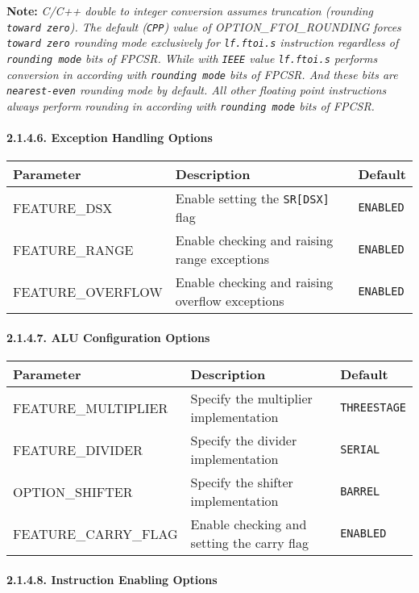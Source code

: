 \documentclass[]{article}
\let\oldparagraph\paragraph
\renewcommand{\paragraph}[1]{\oldparagraph{#1}\mbox{}}
\begin{document}
\textbf{Note:} \emph{C/C++ double to integer conversion assumes
truncation (rounding \texttt{toward\ zero}). The default (\texttt{CPP})
value of OPTION\_FTOI\_ROUNDING forces \texttt{toward\ zero} rounding
mode exclusively for \texttt{lf.ftoi.s} instruction regardless of
\texttt{rounding\ mode} bits of FPCSR. While with \texttt{IEEE} value
\texttt{lf.ftoi.s} performs conversion in according with
\texttt{rounding\ mode} bits of FPCSR. And these bits are
\texttt{nearest-even} rounding mode by default. All other floating point
instructions always perform rounding in according with
\texttt{rounding\ mode} bits of FPCSR.}

\paragraph{2.1.4.6. Exception Handling
Options}\label{exception-handling-options}

\begin{longtable}[]{@{}lll@{}}
\toprule
Parameter & Description & Default\tabularnewline
\midrule
\endhead
FEATURE\_DSX & Enable setting the \texttt{SR{[}DSX{]}} flag &
\texttt{ENABLED}\tabularnewline
FEATURE\_RANGE & Enable checking and raising range exceptions &
\texttt{ENABLED}\tabularnewline
FEATURE\_OVERFLOW & Enable checking and raising overflow exceptions &
\texttt{ENABLED}\tabularnewline
\bottomrule
\end{longtable}

\paragraph{2.1.4.7. ALU Configuration
Options}\label{alu-configuration-options}

\begin{longtable}[]{@{}lll@{}}
\toprule
Parameter & Description & Default\tabularnewline
\midrule
\endhead
FEATURE\_MULTIPLIER & Specify the multiplier implementation &
\texttt{THREESTAGE}\tabularnewline
FEATURE\_DIVIDER & Specify the divider implementation &
\texttt{SERIAL}\tabularnewline
OPTION\_SHIFTER & Specify the shifter implementation &
\texttt{BARREL}\tabularnewline
FEATURE\_CARRY\_FLAG & Enable checking and setting the carry flag &
\texttt{ENABLED}\tabularnewline
\bottomrule
\end{longtable}

\paragraph{2.1.4.8. Instruction Enabling
Options}\label{instruction-enabling-options}
\end{document}
